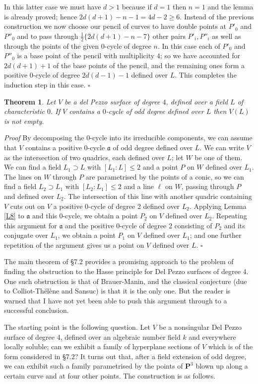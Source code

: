 \documentclass[12pt]{article}
\def\bP{{\mathbf P}}
\def\fa{{\mathfrak a}}
\def\qed{{\hfill$\square$}}
\def\bth{\begin{theorem} \label}
\def\eth{\end{theorem}}
\newtheorem{theorem}{Theorem}
\def\half{{\textstyle{\frac{1}{2}}}}
\begin{document}
In this latter case we must have $d>1$ because if $d=1$ then $n=1$ and the
lemma is already proved; hence $2d(d+1)-n-1=4d-2\geq6$. Instead of the previous
construction we now choose our pencil of curves to have double points at $P'_0$ and $P''_0$ and to pass through $\half\{2d(d+1)-n-7\}$ other pairs $P'_i,P''_i$
as well as through the points of the given 0-cycle of degree $n$. In this case
each of $P'_0$ and $P''_0$ is a base point of the pencil with multiplicity $4$;
so we have accounted for $2d(d+1)+1$ of the base points of the pencil, and the
remaining ones form a positive 0-cycle of degree $2d(d-1)-1$ defined over $L$.
This completes the induction step in this case.  \qed
\bth{T5} Let $V$ be a del Pezzo surface of degree $4$, defined over a field $L$
of characteristic $0$. If $V$ contains a $0$-cycle of odd degree defined over
$L$ then $V(L)$ is not empty.
\eth
\emph{Proof} By decomposing the 0-cycle into its irreducible components, we can
assume that $V$ contains a positive 0-cycle $\fa$ of odd degree defined over
$L$. We can write $V$ as the intersection of two quadrics, each defined over
$L$; let $W$ be one of them. We can find a field $L_1\supset L$ with $[L_1:L]
\leq2$ and a point $P$ on $W$ defined over $L_1$. The lines on $W$ through $P$
are parametrised by the points of a conic, so we can find a field $L_2\supset
L_1$ with $[L_2:L_1]\leq2$ and a line $\ell$ on $W$, passing through $P$ and
defined over $L_2$. The intersection of this line with another
quadric containing $V$ cuts out on $V$ a positive 0-cycle of degree 2 defined
over $L_2$. Applying Lemma \ref{L8} to $\fa$ and this 0-cycle, we obtain a
point $P_2$ on $V$ defined over $L_2$. Repeating this argument for $\fa$ and
the positive 0-cycle of degree 2 consisting of $P_2$ and its conjugate over
$L_1$, we obtain a point $P_1$ on $V$ defined over $L_1$; and one further
repetition of the argument gives us a point on $V$ defined
over $L$.  \qed

\medskip

The main theorem of \S7.2 provides a promising approach to the
problem of finding the obstruction to the Hasse principle for
Del Pezzo surfaces of degree 4. One such obstruction is that
of Brauer-Manin, and the classical conjecture (due to
Colliot-Th\'{e}l\`{e}ne and Sansuc) is that it is the only
one. But the reader is warned that I have not yet been able to
push this argument through to a successful conclusion.

The starting point is the following question. Let $V$ be a
nonsingular Del Pezzo surface of degree 4, defined over an
algebraic number field $k$ and everywhere locally soluble;
can we exhibit a family of hyperplane sections of $V$ which is
of the form considered in \S7.2? It turns out that, after a
field extension of odd degree, we can exhibit such a family
parametrised by the points of $\bP^3$ blown up along a certain
curve and at four other points. The construction is as follows.
\end{document}
